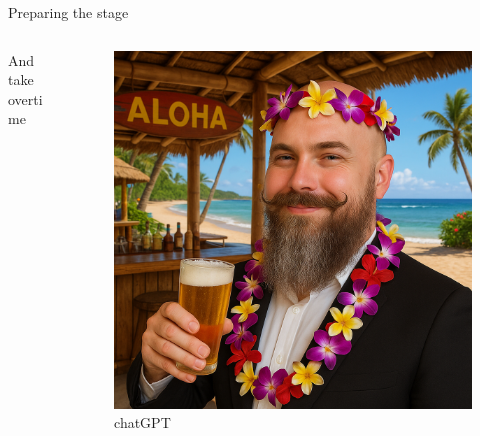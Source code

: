 \documentclass[aspectratio=169]{beamer}
\begin{document}
\begin{frame}{Preparing the stage}

  \begin{columns}
    \begin{column}{0.4\textwidth}
      And take overtime
    \end{column}
    \begin{column}{0.4\textwidth}
      \begin{figure}
        \includegraphics[height = 0.7\textheight]{images/urs_hawaii.png}
        \caption{\footnotesize chatGPT}
      \end{figure}
    \end{column}
  \end{columns}

\end{frame}
\end{document}
